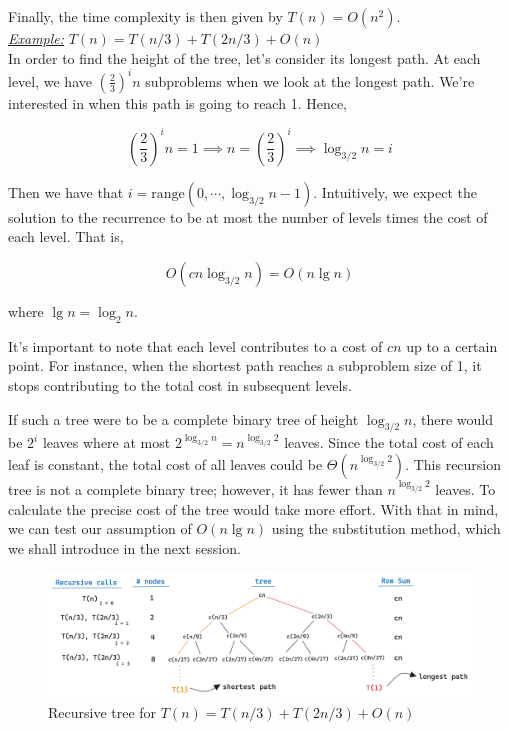 \documentclass[a4paper,10pt]{article}
\newcommand{\hlt}[1]{\colorbox{color3}{#1}}
\begin{document}
Finally, the time complexity is then given by \hlt{$T(n) = O(n^2)$}.\\

\textit{\underline{Example:}} $T(n) = T(n/3) + T(2n/3) + O(n)$\\

In order to find the height of the tree, let's consider its \hlt{longest path}. At each level, we have $\left( \frac{2}{3} \right)^i n$ subproblems when we look at the longest path. We're interested in when this path is going to reach 1. Hence, 

\begin{equation}
    \left( \frac{2}{3} \right)^i n = 1 \implies n = \left( \frac{2}{3} \right)^i \implies \log_{3/2}{n} = i
\end{equation}

Then we have that $i = \text{range}(0, \cdots, \log_{3/2}{n} - 1)$. Intuitively, we expect the solution to the recurrence to be at most the number of levels times the cost of each level. That is, 

\begin{equation}
    O(cn \log_{3/2}{n}) = O(n \lg n)
\end{equation}

where $\lg n = \log_{2} n$. 

It's important to note that each level contributes to a cost of $cn$ up to a certain point. For instance, when the shortest path reaches a subproblem size of 1, it stops contributing to the total cost in subsequent levels.

If such a tree were to be a complete \hlt{binary tree} of height $\log_{3/2}{n}$, there would be $2^i$ leaves where at most $2^{\log_{3/2}{n}} = n^{\log_{3/2}{2}}$ leaves. Since the total cost of each leaf is constant, the total cost of all leaves could be $\Theta(n^{\log_{3/2}{2}})$. This recursion tree is not a complete binary tree; however, it has fewer than $n^{\log_{3/2}{2}}$ leaves. To calculate the precise cost of the tree would take more effort. With that in mind, we can test our assumption of $O(n \lg n)$ using the substitution method, which we shall introduce in the next session.

\begin{figure}[ht]
\centering
\includegraphics[width=0.7\linewidth]{figures/recursive_tree_example.png}
\caption{Recursive tree for $T(n) = T(n/3) + T(2n/3) + O(n)$}
\label{fig:recursive_tree_example}
\end{figure}
\end{document}
